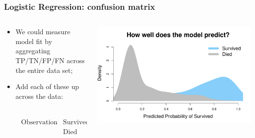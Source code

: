 \documentclass[aspectratio=169]{beamer}
\theoremstyle{principle}
\begin{document}
\begin{frame}
\frametitle{Logistic Regression: confusion matrix}

\begin{columns}
\begin{column}{0.5\textwidth}

\begin{itemize}
\item We could measure model fit by aggregating TP/TN/FP/FN across the entire data set;
\bigskip
\bigskip

\item Add each of these up across the data:
\begin{align*}
\begin{array}{cccc}
&&\mbox{Prediction}&\\
&&\mbox{Survived}&\mbox{Died}\\
\mbox{Observation}&\mbox{Survived}&\#\mbox{TP}&\#\mbox{FN}\\
&\mbox{Died}&\#\mbox{FP}&\#\mbox{TN}\\
\end{array}
\end{align*}

\end{itemize}

\end{column}
\begin{column}{0.5\textwidth}

\includegraphics[scale=0.35]{titanic_prediction_dens.pdf}

\end{column}
\end{columns}

\end{frame}
\end{document}
